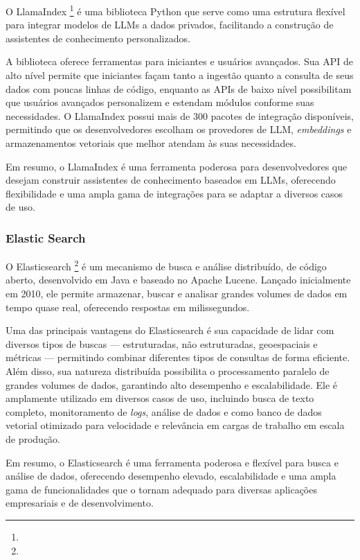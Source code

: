 \documentclass[a4paper, 12pt]{article}
\begin{document}
    O LlamaIndex \footnote{} é uma biblioteca Python que serve como uma estrutura flexível para integrar modelos de LLMs a dados privados, facilitando a construção de assistentes de conhecimento personalizados.

    A biblioteca oferece ferramentas para iniciantes e usuários avançados. Sua API de alto nível permite que iniciantes façam tanto a ingestão quanto a consulta de seus dados com poucas linhas de código, enquanto as APIs de baixo nível possibilitam que usuários avançados personalizem e estendam módulos conforme suas necessidades. O LlamaIndex possui mais de 300 pacotes de integração disponíveis, permitindo que os desenvolvedores escolham os provedores de LLM, \textit{embeddings} e armazenamentos vetoriais que melhor atendam às suas necessidades.

    Em resumo, o LlamaIndex é uma ferramenta poderosa para desenvolvedores que desejam construir assistentes de conhecimento baseados em LLMs, oferecendo flexibilidade e uma ampla gama de integrações para se adaptar a diversos casos de uso.

    \subsubsection{Elastic Search} \label{sec:elasticsearch}

    O Elasticsearch \footnote{} é um mecanismo de busca e análise distribuído, de código aberto, desenvolvido em Java e baseado no Apache Lucene. Lançado inicialmente em 2010, ele permite armazenar, buscar e analisar grandes volumes de dados em tempo quase real, oferecendo respostas em milissegundos.

    Uma das principais vantagens do Elasticsearch é sua capacidade de lidar com diversos tipos de buscas — estruturadas, não estruturadas, geoespaciais e métricas — permitindo combinar diferentes tipos de consultas de forma eficiente. Além disso, sua natureza distribuída possibilita o processamento paralelo de grandes volumes de dados, garantindo alto desempenho e escalabilidade. Ele é amplamente utilizado em diversos casos de uso, incluindo busca de texto completo, monitoramento de \textit{logs}, análise de dados e como banco de dados vetorial otimizado para velocidade e relevância em cargas de trabalho em escala de produção.

    Em resumo, o Elasticsearch é uma ferramenta poderosa e flexível para busca e análise de dados, oferecendo desempenho elevado, escalabilidade e uma ampla gama de funcionalidades que o tornam adequado para diversas aplicações empresariais e de desenvolvimento.
\end{document}
